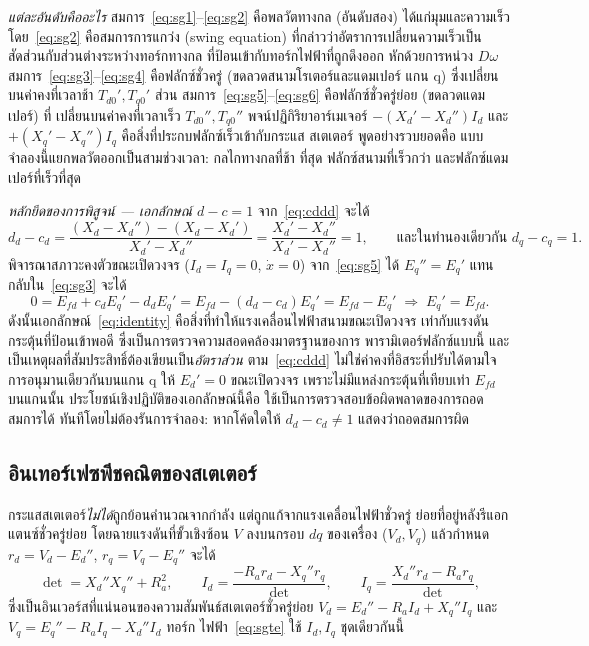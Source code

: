 \documentclass[12pt,a4paper]{article}
\begin{document}
\emph{แต่ละอันดับคืออะไร} สมการ~\eqref{eq:sg1}--\eqref{eq:sg2} คือพลวัตทางกล
(อันดับสอง) ได้แก่มุมและความเร็ว โดย~\eqref{eq:sg2} คือสมการการแกว่ง (swing
equation) ที่กล่าวว่าอัตราการเปลี่ยนความเร็วเป็นสัดส่วนกับส่วนต่างระหว่างทอร์กทางกล
ที่ป้อนเข้ากับทอร์กไฟฟ้าที่ถูกดึงออก หักด้วยการหน่วง $D\omega$
สมการ~\eqref{eq:sg3}--\eqref{eq:sg4} คือฟลักซ์ชั่วครู่ (ขดลวดสนามโรเตอร์และแดมเปอร์
แกน q) ซึ่งเปลี่ยนบนค่าคงที่เวลาช้า $T_{d0}',T_{q0}'$ ส่วน
สมการ~\eqref{eq:sg5}--\eqref{eq:sg6} คือฟลักซ์ชั่วครู่ย่อย (ขดลวดแดมเปอร์) ที่
เปลี่ยนบนค่าคงที่เวลาเร็ว $T_{d0}'',T_{q0}''$ พจน์ปฏิกิริยาอาร์เมเจอร์
$-(X_d'-X_d'')I_d$ และ $+(X_q'-X_q'')I_q$ คือสิ่งที่ประกบฟลักซ์เร็วเข้ากับกระแส
สเตเตอร์ พูดอย่างรวบยอดคือ แบบจำลองนี้แยกพลวัตออกเป็นสามช่วงเวลา: กลไกทางกลที่ช้า
ที่สุด ฟลักซ์สนามที่เร็วกว่า และฟลักซ์แดมเปอร์ที่เร็วที่สุด

\emph{หลักยึดของการพิสูจน์ --- เอกลักษณ์ $d-c=1$}
จาก~\eqref{eq:cddd} จะได้
\begin{equation}
  d_d-c_d=\frac{(X_d-X_d'')-(X_d-X_d')}{X_d'-X_d''}
         =\frac{X_d'-X_d''}{X_d'-X_d''}=1,
  \qquad\text{และในทำนองเดียวกัน } d_q-c_q=1.
  \label{eq:identity}
\end{equation}
พิจารณาสภาวะคงตัวขณะเปิดวงจร ($I_d=I_q=0$, $\dot x=0$) จาก~\eqref{eq:sg5} ได้
$E_q''=E_q'$ แทนกลับใน~\eqref{eq:sg3} จะได้
\begin{equation}
  0=E_{fd}+c_d E_q'-d_d E_q'=E_{fd}-(d_d-c_d)E_q'=E_{fd}-E_q'
  \;\Longrightarrow\; E_q'=E_{fd}.
\end{equation}
ดังนั้นเอกลักษณ์~\eqref{eq:identity} คือสิ่งที่ทำให้แรงเคลื่อนไฟฟ้าสนามขณะเปิดวงจร
เท่ากับแรงดันกระตุ้นที่ป้อนเข้าพอดี ซึ่งเป็นการตรวจความสอดคล้องมาตรฐานของการ
พารามิเตอร์ฟลักซ์แบบนี้ และเป็นเหตุผลที่สัมประสิทธิ์ต้องเขียนเป็น\emph{อัตราส่วน}
ตาม~\eqref{eq:cddd} ไม่ใช่ค่าคงที่อิสระที่ปรับได้ตามใจ การอนุมานเดียวกันบนแกน q
ให้ $E_d'=0$ ขณะเปิดวงจร เพราะไม่มีแหล่งกระตุ้นที่เทียบเท่า $E_{fd}$ บนแกนนั้น
ประโยชน์เชิงปฏิบัติของเอกลักษณ์นี้คือ ใช้เป็นการตรวจสอบข้อผิดพลาดของการถอดสมการได้
ทันทีโดยไม่ต้องรันการจำลอง: หากโค้ดใดให้ $d_d-c_d\ne1$ แสดงว่าถอดสมการผิด

\subsection{อินเทอร์เฟซพีชคณิตของสเตเตอร์}
กระแสสเตเตอร์\emph{ไม่ได้}ถูกย้อนคำนวณจากกำลัง แต่ถูกแก้จากแรงเคลื่อนไฟฟ้าชั่วครู่
ย่อยที่อยู่หลังรีแอกแตนซ์ชั่วครู่ย่อย โดยฉายแรงดันที่ขั้วเชิงซ้อน $V$ ลงบนกรอบ $dq$
ของเครื่อง ($V_d,V_q$) แล้วกำหนด $r_d=V_d-E_d''$, $r_q=V_q-E_q''$ จะได้
\begin{equation}
  \det=X_d''X_q''+R_a^2,\qquad
  I_d=\frac{-R_a r_d - X_q'' r_q}{\det},\qquad
  I_q=\frac{X_d'' r_d - R_a r_q}{\det},
  \label{eq:stator}
\end{equation}
ซึ่งเป็นอินเวอร์สที่แน่นอนของความสัมพันธ์สเตเตอร์ชั่วครู่ย่อย
$V_d=E_d''-R_a I_d+X_q'' I_q$ และ $V_q=E_q''-R_a I_q-X_d'' I_d$ ทอร์ก
ไฟฟ้า~\eqref{eq:sgte} ใช้ $I_d,I_q$ ชุดเดียวกันนี้
\end{document}
